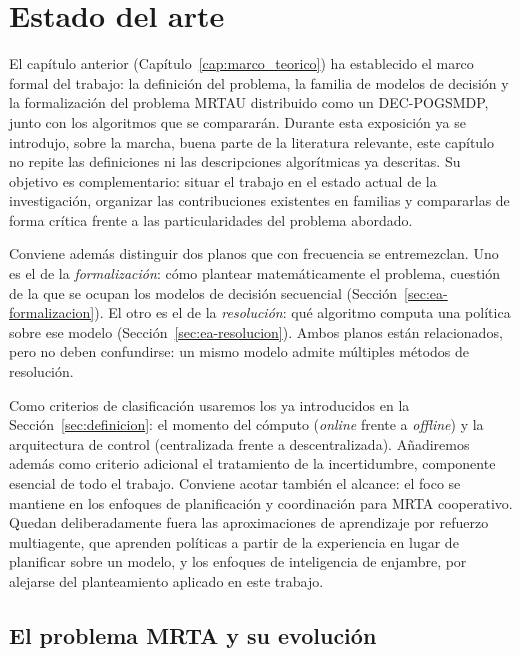 \chapter{Estado del arte}\label{cap:estado_arte}

El capítulo anterior (Capítulo~\ref{cap:marco_teorico}) ha establecido el marco formal del trabajo: la definición del problema, la familia de modelos de decisión y la formalización del problema MRTAU distribuido como un DEC-POGSMDP, junto con los algoritmos que se compararán. Durante esta exposición ya se introdujo, sobre la marcha, buena parte de la literatura relevante, este capítulo no repite las definiciones ni las descripciones algorítmicas ya descritas. Su objetivo es complementario: situar el trabajo en el estado actual de la investigación, organizar las contribuciones existentes en familias y compararlas de forma crítica frente a las particularidades del problema abordado.

Conviene además distinguir dos planos que con frecuencia se entremezclan. Uno es el de la \emph{formalización}: cómo plantear matemáticamente el problema, cuestión de la que se ocupan los modelos de decisión secuencial (Sección~\ref{sec:ea-formalizacion}). El otro es el de la \emph{resolución}: qué algoritmo computa una política sobre ese modelo (Sección~\ref{sec:ea-resolucion}). Ambos planos están relacionados, pero no deben confundirse: un mismo modelo admite múltiples métodos de resolución.

Como criterios de clasificación usaremos los ya introducidos en la Sección~\ref{sec:definicion}: el momento del cómputo (\textit{online} frente a \textit{offline}) y la arquitectura de control (centralizada frente a descentralizada). Añadiremos además como criterio adicional el tratamiento de la incertidumbre, componente esencial de todo el trabajo. Conviene acotar también el alcance: el foco se mantiene en los enfoques de planificación y coordinación para MRTA cooperativo. Quedan deliberadamente fuera las aproximaciones de aprendizaje por refuerzo multiagente, que aprenden políticas a partir de la experiencia en lugar de planificar sobre un modelo, y los enfoques de inteligencia de enjambre, por alejarse del planteamiento aplicado en este trabajo.


\section{El problema MRTA y su evolución} \label{sec:ea-mrta}

